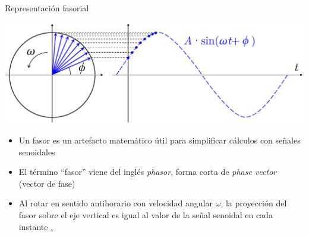 \documentclass[aspectratio=169, usenames,svgnames,dvipsnames]{beamer}
\begin{document}

\begin{frame}{Representación fasorial}

    \begin{center}
        \includegraphics[height=0.45\textheight]{../figs/Fasor_rotante.pdf}
    \end{center}

    \vspace{-2mm}
    \begin{itemize}
        \item Un \alert{fasor} es un artefacto matemático \alert{útil para simplificar cálculos} con señales senoidales

        \vspace{2mm}
        \item El término ``fasor'' viene del inglés \textit{phasor}, forma corta de \textit{phase vector} (vector de fase)

        \vspace{2mm}
        \item Al \alert{rotar en sentido antihorario} con velocidad angular $\omega$, la proyección del fasor sobre el eje vertical es igual al valor de la señal senoidal en cada instante \hyperlink{diapo:gif_fasores}{.}
    \end{itemize}   

\end{frame}

\end{document}
